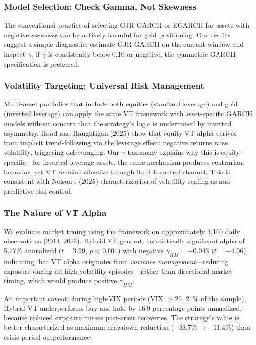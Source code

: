 \subsubsection{Model Selection: Check Gamma, Not Skewness}

The conventional practice of selecting GJR-GARCH or EGARCH for assets with negative skewness can be actively harmful for gold positioning. Our results suggest a simple diagnostic: estimate GJR-GARCH on the current window and inspect $\gamma$. If $\gamma$ is consistently below 0.10 or negative, the symmetric GARCH specification is preferred.

\subsubsection{Volatility Targeting: Universal Risk Management}

Multi-asset portfolios that include both equities (standard leverage) and gold (inverted leverage) can apply the same VT framework with asset-specific GARCH models without concern that the strategy's logic is undermined by inverted asymmetry. Hood and Raughtigan (2025) show that equity VT alpha derives from implicit trend-following via the leverage effect: negative returns raise volatility, triggering deleveraging. Our $\gamma$ taxonomy explains why this is equity-specific---for inverted-leverage assets, the same mechanism produces contrarian behavior, yet VT remains effective through its risk-control channel. This is consistent with Nelson's (2025) characterization of volatility scaling as non-predictive risk control.

\subsubsection{The Nature of VT Alpha}

We evaluate market timing using the \citet{henriksson1981} framework on approximately 3,100 daily observations (2014--2026). Hybrid VT generates statistically significant alpha of 5.77\% annualized ($t = 3.99$, $p < 0.001$) with negative $\gamma_{HM} = -0.043$ ($t = -4.06$), indicating that VT alpha originates from \textit{variance management}---reducing exposure during all high-volatility episodes---rather than directional market timing, which would produce positive $\gamma_{HM}$.

An important caveat: during high-VIX periods (VIX $> 25$, 21\% of the sample), Hybrid VT underperforms buy-and-hold by 16.9 percentage points annualized, because reduced exposure misses post-crisis recoveries. The strategy's value is better characterized as maximum drawdown reduction ($-33.7\% \to -11.4\%$) than crisis-period outperformance.

